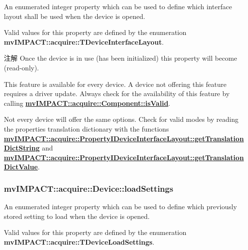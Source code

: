 An enumerated integer property which can be used to define which interface layout shall be used when the device is opened. 

Valid values for this property are defined by the enumeration {\bfseries mv\+I\+M\+P\+A\+C\+T\+::acquire\+::\+T\+Device\+Interface\+Layout}.

\begin{DoxyNote}{注解}
Once the device is in use (has been initialized) this property will become {\bfseries }(read-\/only).

This feature is available for every device. A device not offering this feature requires a driver update. Always check for the availability of this feature by calling {\bfseries \hyperlink{classmv_i_m_p_a_c_t_1_1acquire_1_1_component_ac51e55e7e046101f3c6119d84123abd5}{mv\+I\+M\+P\+A\+C\+T\+::acquire\+::\+Component\+::is\+Valid}}.
\end{DoxyNote}
Not every device will offer the same options. Check for valid modes by reading the properties translation dictionary with the functions {\bfseries \hyperlink{classmv_i_m_p_a_c_t_1_1acquire_1_1_enum_property_i_af5ec5a9c3657af2917f4ead78ef067db}{mv\+I\+M\+P\+A\+C\+T\+::acquire\+::\+Property\+I\+Device\+Interface\+Layout\+::get\+Translation\+Dict\+String}} and {\bfseries \hyperlink{classmv_i_m_p_a_c_t_1_1acquire_1_1_enum_property_i_a0c50700ebff2806621c63d03b624f200}{mv\+I\+M\+P\+A\+C\+T\+::acquire\+::\+Property\+I\+Device\+Interface\+Layout\+::get\+Translation\+Dict\+Value}}. \hypertarget{classmv_i_m_p_a_c_t_1_1acquire_1_1_device_ac4bcb8da9f46585ea042a6b3fa618933}{
\subsubsection[{load\+Settings}]{ mv\+I\+M\+P\+A\+C\+T\+::acquire\+::\+Device\+::load\+Settings}}\label{classmv_i_m_p_a_c_t_1_1acquire_1_1_device_ac4bcb8da9f46585ea042a6b3fa618933}


An enumerated integer property which can be used to define which previously stored setting to load when the device is opened. 

Valid values for this property are defined by the enumeration {\bfseries mv\+I\+M\+P\+A\+C\+T\+::acquire\+::\+T\+Device\+Load\+Settings}.

